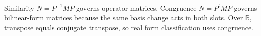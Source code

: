 \begin{perspective} \label{per:ordinary-congruence-bilinear-form-bridge} \\
Similarity $N=P^{-1}MP$ governs operator matrices. Congruence $N=P^tMP$ governs bilinear-form matrices because the same basis change acts in both slots. Over $\mathbb{R}$, transpose equals conjugate transpose, so real form classification uses congruence.
\end{perspective}
